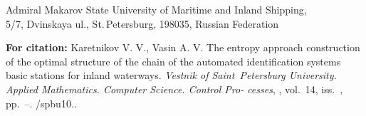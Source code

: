 
{\normalsize

\vskip 6mm


}

\vskip 1.5mm

{\small


\vskip 1.5mm

{\footnotesize \noindent Admiral Makarov State University of
Maritime and Inland Shipping,\\ 5/7, Dvinskaya ul.,
St.\,Petersburg, 198035, Russian Federation

}

\vskip3mm

\noindent \textbf{For citation:}  Karetnikov V. V., Vasin A. V.
The entropy approach construction of the optimal structure of the
chain of the automated identification systems basic stations for
inland waterways. {\it Vestnik of Saint~Petersburg University.
Applied Mathematics. Computer Science. Control Pro-\linebreak
cesses}, \issueyear, vol.~14, iss.~\issuenum,
pp.~\pageref{p7}--\pageref{p7e}.
\doivyp/spbu10.\issueyear.

\vskip3mm

}
